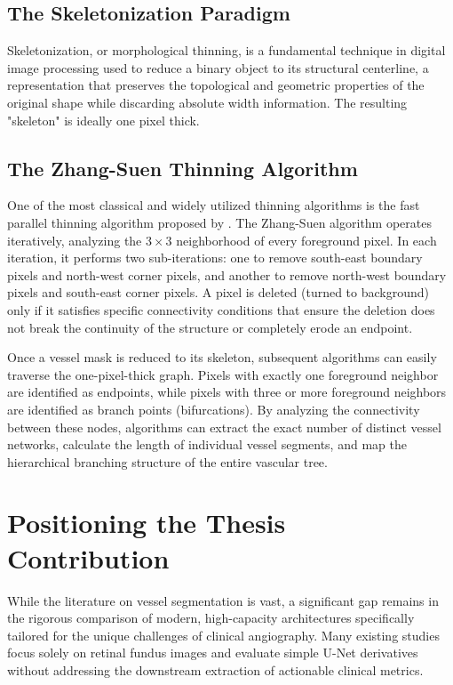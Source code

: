 \subsection{The Skeletonization Paradigm}
Skeletonization, or morphological thinning, is a fundamental technique in digital image processing used to reduce a binary object to its structural centerline, a representation that preserves the topological and geometric properties of the original shape while discarding absolute width information. The resulting "skeleton" is ideally one pixel thick.

\subsection{The Zhang-Suen Thinning Algorithm}
One of the most classical and widely utilized thinning algorithms is the fast parallel thinning algorithm proposed by \textcite{zhang1984fast}. The Zhang-Suen algorithm operates iteratively, analyzing the $3 \times 3$ neighborhood of every foreground pixel. In each iteration, it performs two sub-iterations: one to remove south-east boundary pixels and north-west corner pixels, and another to remove north-west boundary pixels and south-east corner pixels. A pixel is deleted (turned to background) only if it satisfies specific connectivity conditions that ensure the deletion does not break the continuity of the structure or completely erode an endpoint. 

Once a vessel mask is reduced to its skeleton, subsequent algorithms can easily traverse the one-pixel-thick graph. Pixels with exactly one foreground neighbor are identified as endpoints, while pixels with three or more foreground neighbors are identified as branch points (bifurcations). By analyzing the connectivity between these nodes, algorithms can extract the exact number of distinct vessel networks, calculate the length of individual vessel segments, and map the hierarchical branching structure of the entire vascular tree.

\section{Positioning the Thesis Contribution}
While the literature on vessel segmentation is vast, a significant gap remains in the rigorous comparison of modern, high-capacity architectures specifically tailored for the unique challenges of clinical angiography. Many existing studies focus solely on retinal fundus images and evaluate simple U-Net derivatives without addressing the downstream extraction of actionable clinical metrics.

